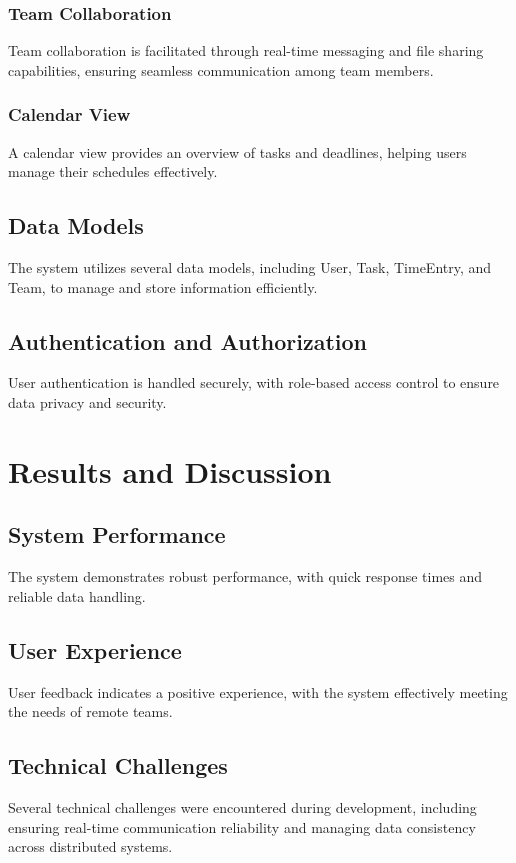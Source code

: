 \documentclass[12pt,a4paper]{article}
\begin{document}
\subsubsection{Team Collaboration}
Team collaboration is facilitated through real-time messaging and file sharing capabilities, ensuring seamless communication among team members.

\subsubsection{Calendar View}
A calendar view provides an overview of tasks and deadlines, helping users manage their schedules effectively.

\subsection{Data Models}
The system utilizes several data models, including User, Task, TimeEntry, and Team, to manage and store information efficiently.

\subsection{Authentication and Authorization}
User authentication is handled securely, with role-based access control to ensure data privacy and security.

\section{Results and Discussion}
\subsection{System Performance}
The system demonstrates robust performance, with quick response times and reliable data handling.

\subsection{User Experience}
User feedback indicates a positive experience, with the system effectively meeting the needs of remote teams.

\subsection{Technical Challenges}
Several technical challenges were encountered during development, including ensuring real-time communication reliability and managing data consistency across distributed systems.
\end{document}
